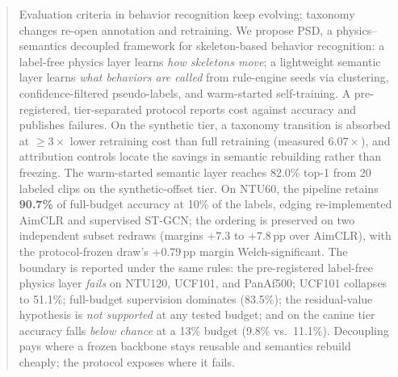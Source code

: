 \documentclass[a4paper,fleqn]{cas-sc}
\begin{document}
\begin{abstract}
Evaluation criteria in behavior recognition keep evolving; taxonomy changes re-open annotation and retraining. We propose PSD, a physics--semantics decoupled framework for skeleton-based behavior recognition: a label-free physics layer learns \emph{how skeletons move}; a lightweight semantic layer learns \emph{what behaviors are called} from rule-engine seeds via clustering, confidence-filtered pseudo-labels, and warm-started self-training. A pre-registered, tier-separated protocol reports cost against accuracy and publishes failures. On the synthetic tier, a taxonomy transition is absorbed at $\geq 3\times$ lower retraining cost than full retraining (measured $6.07\times$), and attribution controls locate the savings in semantic rebuilding rather than freezing. The warm-started semantic layer reaches 82.0\% top-1 from 20 labeled clips on the synthetic-offset tier. On NTU60, the pipeline retains \textbf{90.7\%} of full-budget accuracy at 10\% of the labels, edging re-implemented AimCLR and supervised ST-GCN; the ordering is preserved on two independent subset redraws (margins $+7.3$ to $+7.8$\,pp over AimCLR), with the protocol-frozen draw's $+0.79$\,pp margin Welch-significant. The boundary is reported under the same rules: the pre-registered label-free physics layer \emph{fails} on NTU120, UCF101, and PanAf500; UCF101 collapses to 51.1\%; full-budget supervision dominates (83.5\%); the residual-value hypothesis is \emph{not supported} at any tested budget; and on the canine tier accuracy falls \emph{below chance} at a 13\% budget (9.8\% vs.\ 11.1\%). Decoupling pays where a frozen backbone stays reusable and semantics rebuild cheaply; the protocol exposes where it fails.

\end{abstract}
\end{document}
